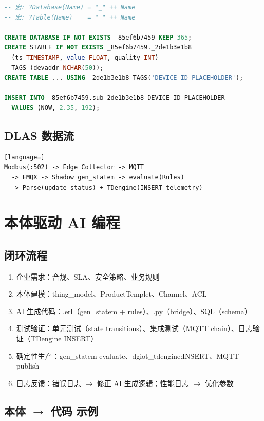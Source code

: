 \documentclass[12pt,a4paper]{ctexart}
\begin{document}
\begin{lstlisting}[language=SQL]
-- 宏: ?Database(Name) = "_" ++ Name
-- 宏: ?Table(Name)    = "_" ++ Name

CREATE DATABASE IF NOT EXISTS _85ef6b7459 KEEP 365;
CREATE STABLE IF NOT EXISTS _85ef6b7459._2de1b3e1b8
  (ts TIMESTAMP, value FLOAT, quality INT)
  TAGS (devaddr NCHAR(50));
CREATE TABLE ... USING _2de1b3e1b8 TAGS('DEVICE_ID_PLACEHOLDER');

INSERT INTO _85ef6b7459.sub_2de1b3e1b8_DEVICE_ID_PLACEHOLDER
  VALUES (NOW, 2.35, 192);
\end{lstlisting}

\subsection{DLAS 数据流}

\begin{lstlisting}[language=]
Modbus(:502) -> Edge Collector -> MQTT
  -> EMQX -> Shadow gen_statem -> evaluate(Rules)
  -> Parse(update status) + TDengine(INSERT telemetry)
\end{lstlisting}

\section{本体驱动 AI 编程}

\subsection{闭环流程}

\begin{enumerate}[leftmargin=*]
  \item 企业需求：合规、SLA、安全策略、业务规则
  \item 本体建模：thing\_model、ProductTemplet、Channel、ACL
  \item AI 生成代码：.erl（gen\_statem + rules）、.py（bridge）、SQL（schema）
  \item 测试验证：单元测试（state transitions）、集成测试（MQTT chain）、日志验证（TDengine INSERT）
  \item 确定性生产：gen\_statem evaluate、dgiot\_tdengine:INSERT、MQTT publish
  \item 日志反馈：错误日志 $\rightarrow$ 修正 AI 生成逻辑；性能日志 $\rightarrow$ 优化参数
\end{enumerate}

\subsection{本体 $\rightarrow$ 代码 示例}
\end{document}
